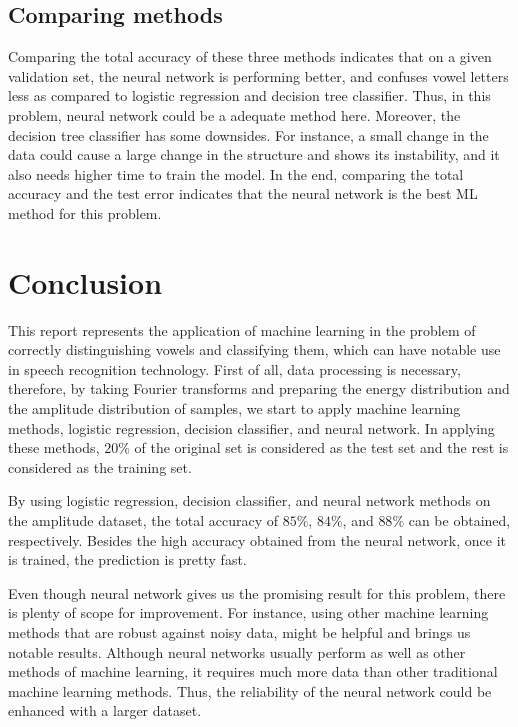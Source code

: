 \documentclass[letterpaper,12pt]{article}
\begin{document}
\subsection{Comparing methods}

Comparing the total accuracy of these three methods indicates that on a given validation set, the neural network is performing better, and confuses vowel letters less as compared to logistic regression and decision tree classifier. Thus, in this problem, neural network could be a adequate method here. Moreover, the decision tree classifier has some downsides. For instance, a small change in the data could cause a large change in the structure and shows its instability, and it also needs higher time to train the model. In the end, comparing the total accuracy and the test error indicates that the neural network is the best ML method for this problem.

\section{Conclusion}
This report represents the application of machine learning in the problem of correctly distinguishing vowels and classifying them, which can have notable use in speech recognition technology. First of all, data processing is necessary, therefore, by taking Fourier transforms and preparing the energy distribution and the amplitude distribution of samples, we start to apply machine learning methods, logistic regression, decision classifier, and neural network. In applying these methods, $20\%$ of the original set is considered as the test set and the rest is considered as the training set.

By using logistic regression, decision classifier, and neural network methods on the amplitude dataset, the total accuracy of $85\%$, $84\%$, and $88\%$ can be obtained, respectively. Besides the high accuracy obtained from the neural network, once it is trained, the prediction is pretty fast.

Even though neural network gives us the promising result for this problem, there is plenty of scope for improvement. For instance, using other machine learning methods that are robust against noisy data, might be helpful and brings us notable results. Although neural networks usually perform as well as other methods of machine learning, it requires much more data than other traditional machine learning methods. Thus, the reliability of the neural network could be enhanced with a larger dataset.
\end{document}
